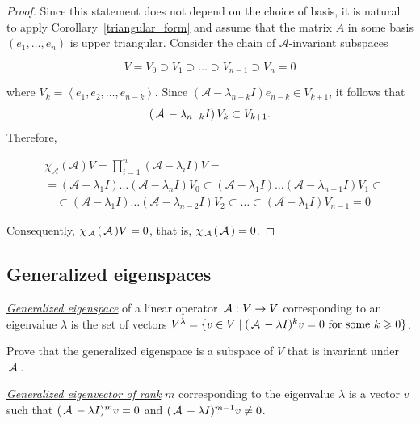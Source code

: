 \begin{proof}
Since this statement does not depend on the choice of basis, it is natural to apply Corollary~\ref{triangular_form} and assume that the matrix $A$ in some basis $(e_1, \ldots, e_n)$ is upper triangular. Consider the chain of $\mathcal{A}$-invariant subspaces

    $$
    V=V_0 \supset V_1 \supset \ldots \supset V_{n-1} \supset V_n=0
    $$
    
    where $V_k=\left\langle e_1, e_2, \ldots, e_{n-k}\right\rangle$. Since $\left(\mathcal{A}-\lambda_{n-k} I\right) e_{n-k} \in V_{k+1}$, it follows that
    $$
    \left(\,\mathcal{A}\,-\lambda_{n-k} I\right) V_k \subset V_{k+1}.
    $$
    Therefore,
    
    $$
    \begin{aligned}
    & \chi_{\mathcal{A}}(\mathcal{A}) V=\prod_{i=1}^n\left(\mathcal{A}-\lambda_i I\right) V= \\
    & =\left(\mathcal{A}-\lambda_1 I\right) \ldots\left(\mathcal{A}-\lambda_n I\right) V_0 \subset\left(\mathcal{A}-\lambda_1 I\right) \ldots\left(\mathcal{A}-\lambda_{n-1} I\right) V_1 \subset \\
    & \quad \subset\left(\mathcal{A}-\lambda_1 I\right) \ldots\left(\mathcal{A}-\lambda_{n-2} I\right) V_2 \subset \ldots \subset\left(\mathcal{A}-\lambda_1 I\right) V_{n-1}=0
    \end{aligned}
    $$
    
    
    Consequently, $\chi_{\,\mathcal{A}\,}(\,\mathcal{A}\,) V=0$, that is, $\chi_{\,\mathcal{A}\,}(\,\mathcal{A}\,)=0$.
\end{proof}

\subsection{Generalized eigenspaces}

\begin{definition}
\underline{\it Generalized eigenspace} of a linear operator $\,\mathcal{A}\,\colon V \to V$ corresponding to an eigenvalue $\lambda$ is the set of vectors $V^{\lambda} = \{v \in V \mid (\,\mathcal{A}\, - \lambda I)^k v = 0 \text{ for some } k \geqslant 0\}$.
\end{definition}

\begin{exercise}
Prove that the generalized eigenspace is a subspace of $V$ that is invariant under $\,\mathcal{A}\,$.
\end{exercise}

\begin{definition}
\underline{\it Generalized eigenvector of rank} $m$ corresponding to the eigenvalue $\lambda$ is a vector $v$ such that $(\,\mathcal{A}\, - \lambda I)^m v = 0$ and $(\,\mathcal{A}\, - \lambda I)^{m - 1} v \neq 0$.
\end{definition}

